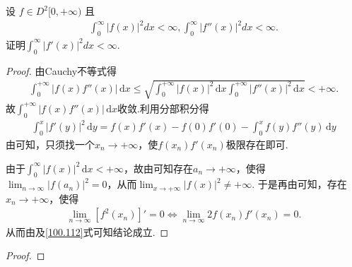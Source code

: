 \documentclass[../../main.tex]{subfiles}
\begin{document}
\begin{example}
设 $f \in D^2[0, +\infty)$ 且
\begin{align*}
\int_0^{\infty} |f(x)|^2 dx < \infty, \int_0^{\infty} |f''(x)|^2 dx < \infty.
\end{align*}
证明$\int_0^{\infty} |f'(x)|^2 dx < \infty$.
\end{example}
\begin{proof}
由Cauchy不等式得
\begin{align*}
\int_0^{+\infty}|f(x)f''(x)|\,\mathrm{d}x\leqslant\sqrt{\int_0^{+\infty}|f(x)|^2\,\mathrm{d}x\int_0^{+\infty}|f''(x)|^2\,\mathrm{d}x}<+\infty.
\end{align*}
故$\int_0^{+\infty}|f(x)f''(x)|\,\mathrm{d}x$收敛.利用分部积分得
\begin{align}\label{100.112}
\int_0^x|f'(y)|^2\,\mathrm{d}y=f(x)f'(x)-f(0)f'(0)-\int_0^x f(y)f''(y)\,\mathrm{d}y
\end{align}
由可知，只须找一个$x_n\rightarrow+\infty$，使$f(x_n)f'(x_n)$极限存在即可.

由于$\int_0^{\infty}|f(x)|^2\,\mathrm{d}x<+\infty$，故由可知存在$a_n\rightarrow+\infty$，使得$\lim_{n\rightarrow\infty}|f(a_n)|^2=0$，从而$\lim_{x\rightarrow+\infty}|f(x)|^2\ne+\infty$.
于是再由可知，存在$x_n\rightarrow+\infty$，使得
\begin{align*}
\lim_{n\rightarrow\infty}[f^2(x_n)]'=0\Longleftrightarrow\lim_{n\rightarrow\infty}2f(x_n)f'(x_n)=0.
\end{align*}
从而由及\eqref{100.112}式可知结论成立.
\end{proof}

\begin{example}

\end{example}
\begin{proof}

\end{proof}
\end{document}
